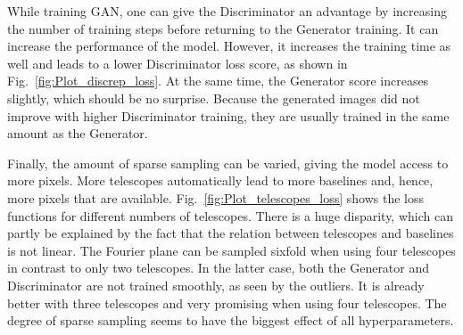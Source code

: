 While training GAN, one can give the Discriminator an advantage by increasing the number of training steps before returning to the Generator training. It can increase the performance of the model. However, it increases the training time as well and leads to a lower Discriminator loss score, as shown in Fig.~\ref{fig:Plot_discrep_loss}. At the same time, the Generator score increases slightly, which should be no surprise. Because the generated images did not improve with higher Discriminator training, they are usually trained in the same amount as the Generator.

Finally, the amount of sparse sampling can be varied, giving the model access to more pixels. More telescopes automatically lead to more baselines and, hence, more pixels that are available. Fig.~\ref{fig:Plot_telescopes_loss} shows the loss functions for different numbers of telescopes. There is a huge disparity, which can partly be explained by the fact that the relation between telescopes and baselines is not linear. The Fourier plane can be sampled sixfold when using four telescopes in contrast to only two telescopes. In the latter case, both the Generator and Discriminator are not trained smoothly, as seen by the outliers. It is already better with three telescopes and very promising when using four telescopes. The degree of sparse sampling seems to have the biggest effect of all hyperparameters.